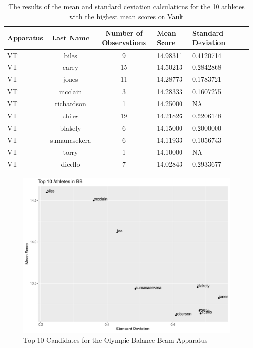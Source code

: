 \documentclass[12pt]{article}
\begin{document}
 \begin{table}[tbp]
  \caption{The results of the mean and standard deviation calculations for the 10 athletes with the highest 
  mean scores on Vault}
  \label{tab:tableVT}
\centering
\begin{tabular}[t]{lccllll}
 \toprule
  Apparatus & Last Name & Number of Observations & Mean Score & Standard Deviation\\
  \midrule
  VT & biles & 9 & 14.98311 & 0.4120714\\
  \midrule
  VT & carey & 15 & 14.50213 & 0.2842868\\
  \midrule
  VT & jones & 11 & 14.28773 & 0.1783721\\
  \midrule
  VT & mcclain & 3 & 14.28333 & 0.1607275\\
  \midrule
  VT & richardson & 1 & 14.25000 & NA\\
  \midrule
  VT & chiles & 19 & 14.21826 & 0.2206148\\
  \midrule
  VT & blakely & 6 & 14.15000 & 0.2000000\\
  \midrule
  VT & sumanasekera & 6 & 14.11933 & 0.1056743\\
  \midrule
  VT & torry & 1 & 14.10000 & NA\\
  \midrule
  VT & dicello & 7 & 14.02843 & 0.2933677\\
   \bottomrule
\end{tabular}
\end{table}

\begin{figure}[tbp]
  \centering
  \includegraphics[scale=0.6]{Top10AthletesBB.pdf}
  \caption{Top 10 Candidates for the Olympic Balance Beam Apparatus}
  \label{fig:BB}
\end{figure}
\end{document}
